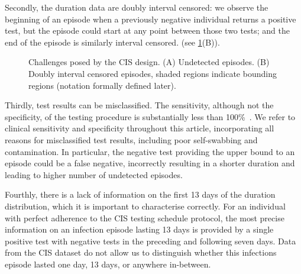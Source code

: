 \documentclass[12pt]{article}
\makeatletter
\DeclareRobustCommand\onedot{\futurelet\@let@token\@onedot}
\def\@onedot{\ifx\@let@token.\else.\null\fi\xspace}
\def\ie{i.e\onedot} \def\Ie{{I.e}\onedot}
\makeatother
\begin{document}

Secondly, the duration data are doubly interval censored: we observe the beginning of an episode when a previously negative individual returns a positive test, but the episode could start at any point between those two tests; and the end of the episode is similarly interval censored. 
(see \cref{fig:challenges}(B)).

\begin{figure}
  \caption{%
    Challenges posed by the CIS design.
    (A) Undetected episodes.
    (B) Doubly interval censored episodes, shaded regions indicate bounding regions (notation formally defined later).
  }
  \label{fig:challenges}
\end{figure}


Thirdly, test results can be misclassified.
The sensitivity, although not the specificity, of the testing procedure is substantially less than 100\%~\citep{cisMethodsONS}.
We refer to clinical sensitivity and specificity throughout this article, incorporating all reasons for misclassified test results, including poor self-swabbing and contamination.
In particular, the negative test providing the upper bound to an episode could be a false negative, incorrectly resulting in a shorter duration and leading to higher number of undetected episodes.

Fourthly, there is a lack of information on the first 13 days of the duration distribution, which it is important to characterise correctly.
For an individual with perfect adherence to the CIS testing schedule protocol, the most precise information on an infection episode lasting 13 days is provided by a single positive test with negative tests in the preceding and following seven days.
Data from the CIS dataset do not allow us to distinguish whether this infections episode lasted one day, 13 days, or anywhere in-between.
\end{document}
